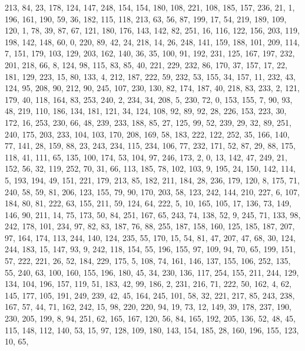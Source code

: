 \begin{DoxyCode}
       213, 84, 23, 178, 124, 147, 248, 154, 154, 180, 108, 221, 108, 185, 157, 236, 21, 1, 196, 161, 190, 59, 36,
       182, 115, 118, 213, 63, 56, 87, 199, 17, 54, 219, 189, 109, 120, 1, 78, 39, 87, 67, 121, 180, 176, 143, 142,
       82, 251, 16, 116, 122, 156, 203, 119, 198, 142, 148, 60, 0, 220, 89, 42, 24, 218, 14, 26, 248, 141, 159, 188,
       101, 209, 114, 7, 151, 179, 103, 129, 203, 162, 140, 36, 35, 100, 91, 192, 231, 125, 167, 197, 232, 201,
       218, 66, 8, 124, 98, 115, 83, 85, 40, 221, 229, 232, 86, 170, 37, 157, 17, 22, 181, 129, 223, 15, 80, 133, 4,
       212, 187, 222, 59, 232, 53, 155, 34, 157, 11, 232, 43, 124, 95, 208, 90, 212, 90, 245, 107, 230, 130, 82,
       174, 187, 40, 218, 83, 233, 2, 121, 179, 40, 118, 164, 83, 253, 240, 2, 234, 34, 208, 5, 230, 72, 0, 153, 155,
       7, 90, 93, 48, 219, 110, 186, 134, 181, 121, 34, 124, 108, 92, 89, 92, 28, 226, 153, 223, 30, 172, 16, 253,
       230, 66, 48, 239, 233, 188, 85, 27, 125, 99, 52, 239, 29, 32, 89, 251, 240, 175, 203, 233, 104, 103, 170,
       208, 169, 58, 183, 222, 122, 252, 35, 166, 140, 77, 141, 28, 159, 88, 23, 243, 234, 115, 234, 106, 77, 232,
       171, 52, 87, 29, 88, 175, 118, 41, 111, 65, 135, 100, 174, 53, 104, 97, 246, 173, 2, 0, 13, 142, 47, 249, 21,
       152, 56, 32, 119, 252, 70, 31, 66, 113, 185, 78, 102, 103, 9, 195, 24, 150, 142, 114, 5, 193, 194, 49, 151,
       221, 179, 213, 85, 182, 211, 184, 28, 236, 179, 120, 8, 175, 71, 240, 58, 59, 81, 206, 123, 155, 79, 90,
       170, 203, 58, 123, 242, 144, 210, 227, 6, 107, 184, 80, 81, 222, 63, 155, 211, 59, 124, 64, 222, 5, 10, 165,
       105, 17, 136, 73, 149, 146, 90, 211, 14, 75, 173, 50, 84, 251, 167, 65, 243, 74, 138, 52, 9, 245, 71, 133,
       98, 242, 178, 101, 234, 97, 82, 83, 187, 76, 88, 255, 187, 158, 160, 125, 185, 187, 207, 97, 164, 174, 113,
       244, 140, 124, 235, 55, 170, 15, 54, 81, 47, 207, 47, 68, 30, 124, 244, 183, 15, 147, 93, 9, 242, 118, 154,
       55, 196, 155, 97, 109, 94, 70, 65, 199, 151, 57, 222, 221, 26, 52, 184, 229, 175, 5, 108, 74, 161, 146, 137,
       155, 106, 252, 135, 55, 240, 63, 100, 160, 155, 196, 180, 45, 34, 230, 136, 117, 254, 155, 211, 244, 129,
       134, 104, 196, 157, 119, 51, 183, 42, 99, 186, 2, 231, 216, 71, 222, 50, 162, 4, 62, 145, 177, 105, 191, 249,
       239, 42, 45, 164, 245, 101, 58, 32, 221, 217, 85, 243, 238, 167, 57, 44, 71, 162, 242, 15, 98, 220, 220, 94,
       19, 73, 12, 149, 39, 178, 237, 190, 230, 205, 199, 8, 94, 251, 62, 165, 167, 120, 56, 84, 165, 192, 205,
       136, 52, 48, 45, 115, 148, 112, 140, 53, 15, 97, 128, 109, 180, 143, 154, 185, 28, 160, 196, 155, 123, 10, 65,

\end{DoxyCode}
